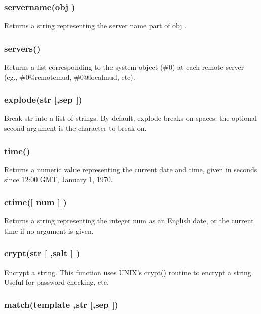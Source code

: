 \subsubsection{\func servername({\funcarg obj })}

Returns a string representing the server name part of {\funcarg obj }.

\subsubsection{\func servers()}

Returns a list corresponding to the system object (\#0) at each remote
server (eg., {\keyword \#0@remotemud}, {\keyword \#0@localmud}, etc).

\subsubsection{\func explode({\funcarg str } $[$,{\funcarg sep } $]$)}

Break {\funcarg str } into a list of strings.  By default, explode
breaks on spaces; the optional second argument is the character to
break on.

\subsubsection{\func time()}

Returns a numeric value representing the current date and time,
given in seconds since 12:00 GMT, January 1, 1970.

\subsubsection{\func ctime({\funcarg $[$ num  $]$ })}

Returns a string representing the integer {\funcarg num } as
an English date, or the current time if no argument is given.

\subsubsection{\func crypt({\funcarg str $[$ },{\funcarg salt $]$ })}

Encrypt a string.  This function uses UNIX's crypt() routine to encrypt
a string.  Useful for password checking, etc.

\subsubsection{\func match({\funcarg template },{\funcarg str } $[$,{\funcarg sep } $]$)}

